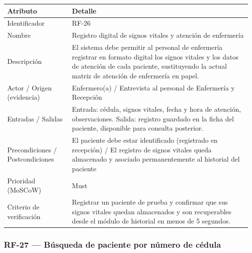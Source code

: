 \documentclass[11pt,a4paper]{article}
\begin{document}
	\begin{longtable}{p{} p{}}
		
		\toprule
		\textbf{Atributo} & \textbf{Detalle} \\
		\midrule
		\endhead
		
		Identificador & RF-26  \\
		Nombre & Registro digital de signos vitales y atención de enfermería \\
		Descripción & El sistema debe permitir al personal de enfermería registrar en formato digital los signos vitales y los datos de atención de cada paciente, sustituyendo la actual matriz de atención de enfermería en papel. \\
		Actor / Origen (evidencia) & Enfermero(a) / Entrevista al personal de Enfermería y Recepción \\
		Entradas / Salidas & Entrada: cédula, signos vitales, fecha y hora de atención, observaciones. Salida: registro guardado en la ficha del paciente, disponible para consulta posterior. \\
		Precondiciones / Postcondiciones & El paciente debe estar identificado (registrado en recepción) / El registro de signos vitales queda almacenado y asociado permanentemente al historial del paciente \\
		Prioridad (MoSCoW) & Must \\
		Criterio de verificación & Registrar un paciente de prueba y confirmar que sus signos vitales quedan almacenados y son recuperables desde el módulo de historial en menos de 5 segundos. \\
		\bottomrule
	\end{longtable}
	
	\subsubsection{RF-27 --- Búsqueda de paciente por número de cédula}
	
\end{document}

